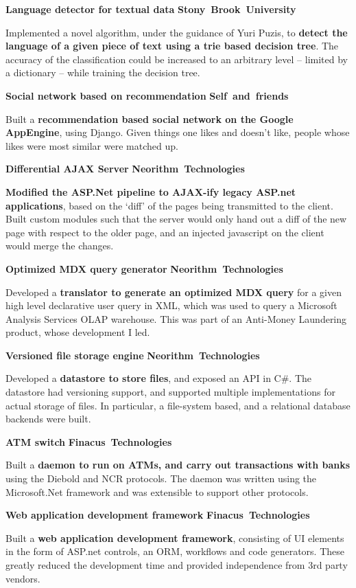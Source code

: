 \documentclass[a4paper,11pt,final]{article}
\newcommand{\projexp}[2]{%
  \vspace{12pt}
  \noindent\textbf{{#1}}
  \hfill
  \hbox{\textbf{{#2}}}
  \\ \vspace{-12pt}
}
\begin{document}
\projexp{Language detector for textual data}{Stony Brook University}

\noindent Implemented a novel algorithm, under the guidance of Yuri
Puzis, to \textbf{detect the language of a given piece of text using a
  trie based decision tree}. The accuracy of the classification could
be increased to an arbitrary level -- limited by a dictionary -- while
training the decision tree.

\projexp{Social network based on recommendation}{Self and friends}

\noindent Built a \textbf{recommendation based social network on the
  Google AppEngine}, using Django. Given things one likes and doesn't
like, people whose likes were most similar were matched up.

\projexp{Differential AJAX Server}{Neorithm Technologies}

\noindent \textbf{Modified the ASP.Net pipeline to AJAX-ify legacy
  ASP.net applications}, based on the `diff' of the pages being
transmitted to the client. Built custom modules such that the server
would only hand out a diff of the new page with respect to the older
page, and an injected javascript on the client would merge the
changes.

\projexp{Optimized MDX query generator}{Neorithm Technologies}

\noindent Developed a \textbf{translator to generate an optimized MDX
  query} for a given high level declarative user query in XML, which
was used to query a Microsoft Analysis Services OLAP warehouse. This
was part of an Anti-Money Laundering product, whose development I led.

\projexp{Versioned file storage engine}{Neorithm Technologies}

\noindent Developed a \textbf{datastore to store files}, and exposed
an API in C\#. The datastore had versioning support, and supported
multiple implementations for actual storage of files. In particular, a
file-system based, and a relational database backends were built.

\projexp{ATM switch}{Finacus Technologies}

\noindent Built a \textbf{daemon to run on ATMs, and carry out
  transactions with banks} using the Diebold and NCR protocols. The
daemon was written using the Microsoft.Net framework and was
extensible to support other protocols.

\projexp{Web application development framework}{Finacus Technologies}

\noindent Built a \textbf{web application development framework}, consisting of
UI elements in the form of ASP.net controls, an ORM, workflows and
code generators. These greatly reduced the development time and
provided independence from 3rd party vendors.
\end{document}
